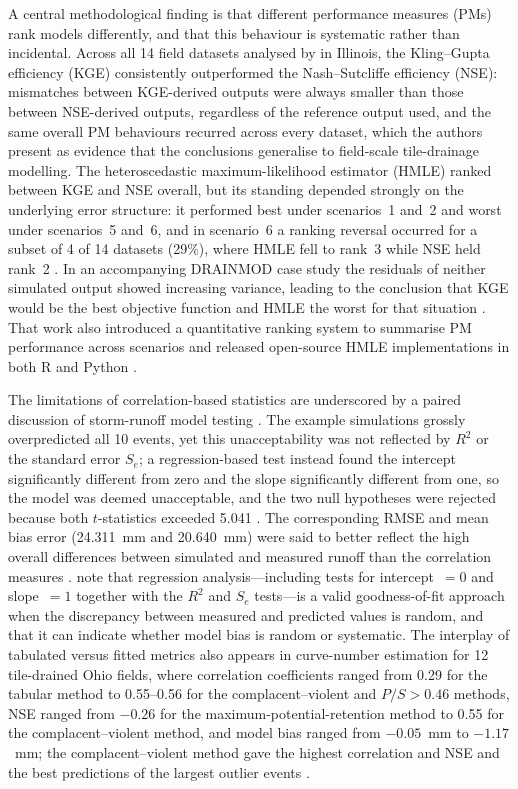 A central methodological finding is that different performance measures (PMs)
rank models differently, and that this behaviour is systematic rather than
incidental. Across all 14 field datasets analysed by \textcite{Bruhn2025} in
Illinois, the Kling--Gupta efficiency (KGE) consistently outperformed the
Nash--Sutcliffe efficiency (NSE): mismatches between KGE-derived outputs were
always smaller than those between NSE-derived outputs, regardless of the
reference output used, and the same overall PM behaviours recurred across every
dataset, which the authors present as evidence that the conclusions generalise
to field-scale tile-drainage modelling. The heteroscedastic maximum-likelihood
estimator (HMLE) ranked between KGE and NSE overall, but its standing depended
strongly on the underlying error structure: it performed best under scenarios~1
and~2 and worst under scenarios~5 and~6, and in scenario~6 a ranking reversal
occurred for a subset of 4 of 14 datasets (29\%), where HMLE fell to rank~3
while NSE held rank~2 \parencite{Bruhn2025}. In an accompanying DRAINMOD case
study the residuals of neither simulated output showed increasing variance,
leading to the conclusion that KGE would be the best objective function and HMLE
the worst for that situation \parencite{Bruhn2025}. That work also introduced a
quantitative ranking system to summarise PM performance across scenarios and
released open-source HMLE implementations in both R and Python
\parencite{Bruhn2025}.

The limitations of correlation-based statistics are underscored by a paired
discussion of storm-runoff model testing \parencite{STONE1995,SAVABI1995}. The
example simulations grossly overpredicted all 10 events, yet this
unacceptability was not reflected by $R^2$ or the standard error $S_e$; a
regression-based test instead found the intercept significantly different from
zero and the slope significantly different from one, so the model was deemed
unacceptable, and the two null hypotheses were rejected because both
$t$-statistics exceeded 5.041 \parencite{STONE1995,SAVABI1995}. The
corresponding RMSE and mean bias error (24.311~mm and 20.640~mm) were said to
better reflect the high overall differences between simulated and measured
runoff than the correlation measures \parencite{STONE1995,SAVABI1995}.
\textcite{SAVABI1995} note that regression analysis---including tests for
intercept~$=0$ and slope~$=1$ together with the $R^2$ and $S_e$ tests---is a
valid goodness-of-fit approach when the discrepancy between measured and
predicted values is random, and that it can indicate whether model bias is
random or systematic. The interplay of tabulated versus fitted metrics also
appears in curve-number estimation for 12 tile-drained Ohio fields, where
correlation coefficients ranged from 0.29 for the tabular method to 0.55--0.56
for the complacent--violent and $P/S>0.46$ methods, NSE ranged from $-0.26$ for
the maximum-potential-retention method to 0.55 for the complacent--violent
method, and model bias ranged from $-0.05$~mm to $-1.17$~mm; the
complacent--violent method gave the highest correlation and NSE and the best
predictions of the largest outlier events \parencite{Wessel2022}.

